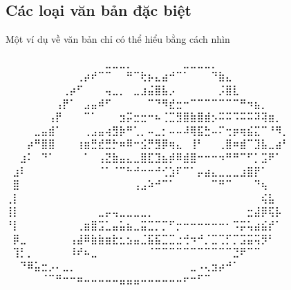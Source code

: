 \newpage
\subsection*{Các loại văn bản đặc biệt}\label{special-text}
Một ví dụ về văn bản chỉ có thể hiểu bằng cách nhìn

\begin{center}
    \begin{minipage}{0.4\textwidth}
        \fontsize{6pt}{9pt}\selectfont
⠀⠀⠀⠀⠀⠀⠀⠀⠀⠀⠀⠀⠀⠀⣀⣀⣀⡀⠀⠀⠀⠀⠀⠀⠀⣀⣀⣀⣀⡀\\
⠀⠀⠀⠀⠀⠀⠀⠀⠀⠀⢀⡴⠞⠉⠉⠀⠀⠛⠉⢗⡦⣄⣴⠚⠉⠁⠀⠀⠀⠙⣷⣄\\
⠀⠀⠀⠀⠀⠀⠀⠀⢀⡴⠋⠀⠀⠀⢤⣀⡀⠀⣀⣰⣬⣿⣧⡠⠀⠀⠀⠀⠀⠀⡨⣿⣇\\
⠀⠀⠀⠀⠀⠀⠀⢠⡟⠁⠀⣠⣤⠾⠋⠀⠀⠀⠀⠀⠉⠙⠻⣞⣒⠒⠉⠉⠉⠉⠉⠉⠉⠛⠲⣦⡀\\
⠀⠀⠀⠀⠀⠀⢠⡟⠀⠀⠀⠉⠁⠀⠀⠀⣲⡭⣒⣒⠒⠦⢈⣉⣻⣿⣷⣿⣾⡢⠭⠭⠩⠭⠭⠽⢽⣶⡀\\
⠀⠀⠀⠀⣀⣤⣾⠁⠀⠀⠀⢀⣠⣤⢴⣻⡷⠛⢁⡀⠤⣀⡂⠤⠤⠼⢿⣯⣓⠤⠍⢒⡶⢶⣮⣍⠉⠘⠻⡀\\
⠀⠀⠀⡴⠛⣿⣿⠀⠀⠀⢰⣶⣛⣞⣛⡓⠶⠿⠒⣪⡛⣻⡿⢶⣄⠀⢸⠃⠀⠀⢀⣿⠶⣾⠉⣹⣧⣀⣴⠃\\
⠀⠀⣰⠅⠀⠙⠁⠀⠀⠀⠀⠁⠀⢠⣝⣷⣤⣄⣀⣿⣏⣹⣦⡾⠿⣾⣿⠒⠒⠒⠲⠛⠛⠉⠋⡁⣩⠟⠁\\
⠀⣰⠇⠀⠀⠀⠀⠀⠀⠀⠀⠀⠀⠈⠁⠈⠉⠓⠚⠒⠒⠚⢊⣱⠏⠉⠁⡤⣴⣄⣀⣀⣀⣰⣿⡟⠁\\
⠀⣿⠀⠀⠀⠀⠀⠀⠀⠀⠀⠀⠀⠀⠀⠀⠀⠀⢠⣠⠵⠚⠉⠁⠀⠀⠀⠀⠀⠉⠛⠉⠀⠀⠀⠙⢦\\
⢀⡇⠀⠀⠀⠀⠀⠀⠀⠀⠀⠀⠀⠀⠀⠀⠀⠀⠀⠀⠀⠀⠀⠀⠀⠀⠀⠀⠀⠀⠀⠀⠀⠀⠀⠀⢮⣧\\
⢸⡇⠀⠀⠀⠀⠀⠀⠀⠀⠀⠀⠀⣀⡤⢤⣀⣀⣀⣀⡀⠀⠀⠀⠀⠀⠀⠀⠀⠀⠀⠀⠀⠀⣒⣼⡿⢯⡧\\
⠘⡇⠀⠀⠀⠀⠀⠀⠀⠀⢀⣶⣿⣩⣁⣤⣥⣦⣀⣭⣉⡉⡉⠋⡒⠒⠒⠒⠒⠒⠒⠂⠩⡭⢥⣴⣮⡞⠁\\
⠀⡿⣀⠀⠀⠀⠀⠀⠀⢠⣼⠿⣷⣷⣶⣗⣂⣢⣤⣈⣯⣯⣉⣉⣐⢚⠲⠚⡈⣉⢉⡋⡉⣩⣭⢭⡻⠃\\
⠀⢹⡃⡀⠀⠀⠀⠀⠀⠸⠞⠦⣀⠀⠀⠀⠀⠀⠀⠀⠈⠉⠉⠉⠉⠉⠉⠉⠉⠉⠉⠉⣙⠟⠉⠉\\
⠀⠀⠙⠿⣥⣒⡠⠄⣀⡀⠀⠀⠀⠀⠀⠀⠀⠀⠀⠀⠀⠀⠀⠀⠀⠀⣀⠠⢄⣲⡴⠚⠁\\
⠀⠀⠀⠀⠀⠈⠉⠛⠒⠒⠶⠤⠤⠤⠤⠤⣤⣤⣤⠤⠤⠤⠤⠤⠤⠖⠒⠋⠉%
    \end{minipage}
\end{center}

